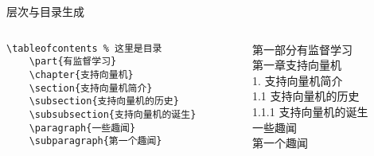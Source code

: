 
\begin{frame}[fragile]{层次与目录生成}
    \begin{columns}
    \begin{column}{.6\textwidth}
    
    \begin{lstlisting}[basicstyle=\ttfamily\small]
    \tableofcontents % 这里是目录
    \part{有监督学习}
    \chapter{支持向量机}
    \section{支持向量机简介}
    \subsection{支持向量机的历史}
    \subsubsection{支持向量机的诞生}
    \paragraph{一些趣闻}
    \subparagraph{第一个趣闻}
    \end{lstlisting}
    \end{column}
    \begin{column}{.4\textwidth}
    第一部分\quad 有监督学习\\
    第一章\quad 支持向量机 \\
    1. 支持向量机简介 \\
    1.1 支持向量机的历史 \\
    1.1.1 支持向量机的诞生 \\
    一些趣闻  \\
    第一个趣闻
    \end{column}
    \end{columns}
    
    \end{frame}
    
